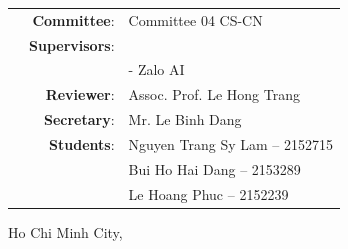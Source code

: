 \begin{titlepage}
\begin{table}[h]
\begin{tabular}{r r l}
& \Large \textbf{Committee}: & \Large Committee 04 CS-CN \\
& \Large \textbf{Supervisors}: & \Large \Lecturer{}\\
&              & \Large \Lecturern{} - \Large Zalo AI\\
& \Large \textbf{Reviewer}: & \Large Assoc. Prof. Le Hong Trang \\
& \Large \textbf{Secretary}: & \Large Mr. Le Binh Dang \\
& \Large \textbf{Students}: & \Large Nguyen Trang Sy Lam -- 2152715 \\
& & \Large Bui Ho Hai Dang -- 2153289 \\
& & \Large Le Hoang Phuc -- 2152239 

\end{tabular}
\end{table}

\vspace{2cm}

\begin{center}
{\large  Ho Chi Minh City, \SubmitTime{}}
\end{center}

\end{titlepage}



